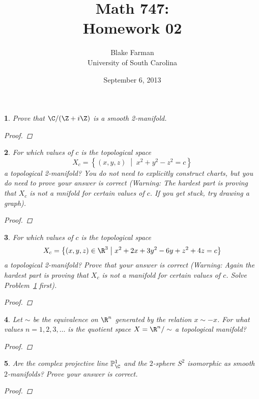 \documentclass[10pt]{amsart}
\author{Blake Farman\\University of South Carolina}
\title{Math 747:\\Homework 02}
\date{September 6, 2013}
\begin{document}
\maketitle

\providecommand{\p}{\mathfrak{p}}
\providecommand{\m}{\mathfrak{m}}

\newtheorem{thm}{}
\newtheorem{lem}{Lemma}

\begin{thm}\label{ex1}
  Prove that $\C/(\Z + i\Z)$ is a smooth 2-manifold.
  
  \begin{proof}
  \end{proof}
\end{thm}

\begin{thm}\label{ex2}
  For which values of $c$ is the topological space
  $$X_c = \left\{(x,y,z) \;\middle\vert\; x^2 + y^2 - z^2 = c\right\}$$
  a topological 2-manifold?
  You do not need to explicitly construct charts, but you do need to prove your answer is correct (Warning: The hardest part is proving that $X_c$ is not a mnifold for certain values of $c$.  If you get stuck, try drawing a graph).

  \begin{proof}
  \end{proof}
\end{thm}

\begin{thm}\label{ex3}
  For which values of $c$ is the topological space
  $$X_c = \left\{(x,y,z) \in \R^3 \;\middle\vert\; x^2 + 2x + 3y^2 - 6y + z^2 + 4z = c\right\}$$
  a topological 2-manifold?
  Prove that your answer is correct (Warning: Again the hardest part is proving that $X_c$ is not a manifold for certain values of $c$.
  Solve Problem~\ref{ex1} first).
  \begin{proof}
  \end{proof}
\end{thm}

\begin{thm}\label{ex4}
  Let $\sim$ be the equivalence on $\R^n$ generated by the relation $x \sim -x$.
  For what values $n = 1,2,3,\ldots$ is the quotient space $X = \R^n/\sim$ a topological manifold?
  
  \begin{proof}
  \end{proof}
\end{thm}

\begin{thm}\label{ex5}
  Are the complex projective line $\mathbb{P}_\C^1$ and the $2$-sphere $S^2$ isomorphic as smooth $2$-manifolds?
  Prove your answer is correct.

  \begin{proof}
  \end{proof}
\end{thm}
\end{document}
